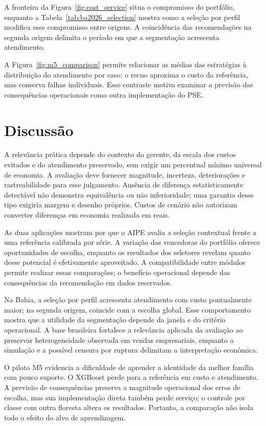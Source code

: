 \documentclass[preprint,12pt]{elsarticle}
\begin{document}

A fronteira da Figura~\ref{fig:cost_service} situa o compromisso do portfólio, enquanto a Tabela~\ref{tab:ba2026_selection} mostra como a seleção por perfil modifica esse compromisso entre origens. A coincidência das recomendações na segunda origem delimita o período em que a segmentação acrescenta atendimento.

A Figura~\ref{fig:m5_comparison} permite relacionar as médias das estratégias à distribuição do atendimento por caso: o recuo aproxima o custo da referência, mas conserva falhas individuais. Esse contraste motiva examinar a previsão das consequências operacionais como outra implementação do PSE.


\section{Discussão}
A relevância prática depende do contexto do gerente, da escala dos custos evitados e do atendimento preservado, sem exigir um percentual mínimo universal de economia. A avaliação deve fornecer magnitude, incerteza, deteriorações e rastreabilidade para esse julgamento. Ausência de diferença estatisticamente detectável não demonstra equivalência ou não inferioridade; uma garantia desse tipo exigiria margem e desenho próprios. Custos de cenário não autorizam converter diferenças em economia realizada em reais.

As duas aplicações mostram por que o AIPE avalia a seleção contextual frente a uma referência calibrada por série. A variação das vencedoras do portfólio oferece oportunidades de escolha, enquanto os resultados dos seletores revelam quanto desse potencial é efetivamente aproveitado. A compatibilidade entre módulos permite realizar essas comparações; o benefício operacional depende das consequências da recomendação em dados reservados.

Na Bahia, a seleção por perfil acrescenta atendimento com custo pontualmente maior; na segunda origem, coincide com a escolha global. Esse comportamento mostra que a utilidade da segmentação depende da janela e do critério operacional. A base brasileira fortalece a relevância aplicada da avaliação ao preservar heterogeneidade observada em vendas empresariais, enquanto a simulação e a possível censura por ruptura delimitam a interpretação econômica.

O piloto M5 evidencia a dificuldade de aprender a identidade da melhor família com pouco suporte. O XGBoost perde para a referência em custo e atendimento. A previsão de consequências preserva a magnitude operacional dos erros de escolha, mas sua implementação direta também perde serviço; o controle por classe com outra floresta altera os resultados. Portanto, a comparação não isola todo o efeito do alvo de aprendizagem.
\end{document}
